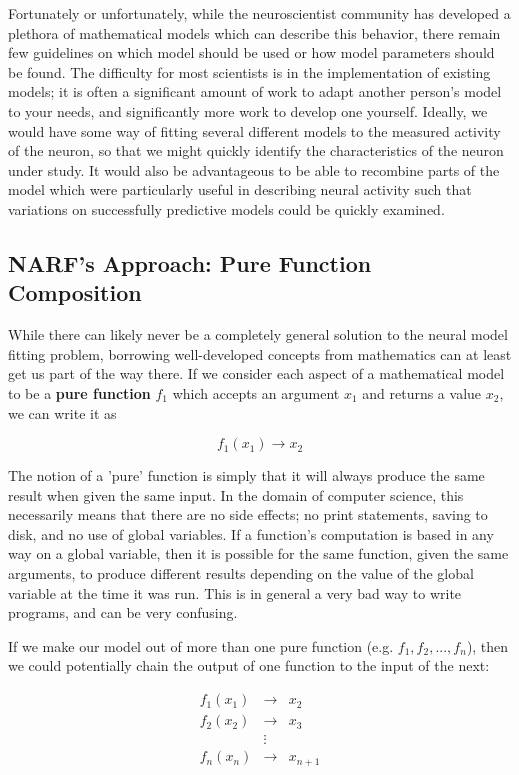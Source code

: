 \documentclass{article}
\newcommand{\definition}[1]{\textbf{#1}}
\begin{document}
Fortunately or unfortunately, while the neuroscientist community has developed a plethora of mathematical models which can describe this behavior, there remain few guidelines on which model should be used or how model parameters should be found. The difficulty for most scientists is in the implementation of existing models; it is often a significant amount of work to adapt another person's model to your needs, and significantly more work to develop one yourself. Ideally, we would have some way of fitting several different models to the measured activity of the neuron, so that we might quickly identify the characteristics of the neuron under study. It would also be advantageous to be able to recombine parts of the model which were particularly useful in describing neural activity such that variations on successfully predictive models could be quickly examined. 

\subsection{NARF's Approach: Pure Function Composition}

While there can likely never be a completely general solution to the neural model fitting problem, borrowing well-developed concepts from mathematics can at least get us part of the way there. If we consider each aspect of a mathematical model to be a \definition{pure function} $f_1$ which accepts an argument $x_1$ and returns a value $x_2$, we can write it as

\begin{equation}
  f_1(x_1) \rightarrow x_2
\end{equation}

The notion of a 'pure' function is simply that it will always produce the same result when given the same input. In the domain of computer science, this necessarily means that there are no side effects; no print statements, saving to disk, and no use of global variables. If a function's computation is based in any way on a global variable, then it is possible for the same function, given the same arguments, to produce different results depending on the value of the global variable at the time it was run. This is in general a very bad way to write programs, and can be very confusing. 

If we make our model out of more than one pure function (e.g. $f_1, f_2, ..., f_n$), then we could potentially chain the output of one function to the input of the next:

\begin{eqnarray*}
f_{1}(x_{1}) & \rightarrow & x_{2}\\
f_{2}(x_{2}) & \rightarrow & x_{3}\\
 & \vdots\\
f_{n}(x_{n}) & \rightarrow & x_{n+1}
\end{eqnarray*}
\end{document}
